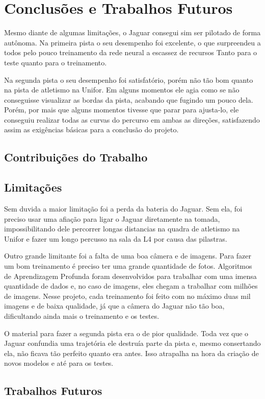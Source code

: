 \chapter{Conclusões e Trabalhos Futuros}
\label{chap:conclusoes-e-trabalhos-futuros}

Mesmo diante de algumas limitações, o Jaguar consegui sim ser pilotado de forma autônoma. Na primeira pista o seu desempenho foi excelente, o que surpreendeu a todos pelo pouco treinamento da rede neural a escassez de recursos Tanto para o teste quanto para o treinamento.

Na segunda pista o seu desempenho foi satisfatório, porém não tão bom quanto na pista de atletismo na Unifor. Em alguns momentos ele agia como se não conseguisse visualizar as bordas da pista, acabando que fugindo um pouco dela. Porém, por mais que alguns momentos tivesse que parar para ajusta-lo, ele conseguiu realizar todas as curvas do percurso em ambas as direções, satisfazendo assim as exigências básicas para a conclusão do projeto.
\section{Contribuições do Trabalho}
\label{sec:contribuicoes-do-trabalho}

\section{Limitações}
\label{sec:limitacoes}

Sem duvida a maior limitação foi a perda da bateria do Jaguar. Sem ela, foi preciso usar uma afiação para ligar o Jaguar diretamente na tomada, impossibilitando dele percorrer longas distancias na quadra de atletismo na Unifor e fazer um longo percusso na sala da L4 por causa das pilastras. 

Outro grande limitante foi a falta de uma boa câmera e de imagens. Para fazer um bom treinamento é preciso ter uma grande quantidade de fotos. Algoritmos de Aprendizagem Profunda foram desenvolvidos para trabalhar com uma imensa quantidade de dados e, no caso de imagens, eles chegam a trabalhar com milhões de imagens. Nesse projeto, cada treinamento foi feito com no máximo duas mil imagens e de baixa qualidade, já que a câmera do Jaguar não tão boa, dificultando ainda mais o treinamento e os testes.

O material para fazer a segunda pista era o de pior qualidade. Toda vez que o Jaguar confundia uma trajetória ele destruía parte da pista e, mesmo consertando ela, não ficava tão perfeito quanto era antes. Isso atrapalha na hora da criação de novos modelos e até para os testes.

\section{Trabalhos Futuros}
\label{sec:trabalhos-futuros}





